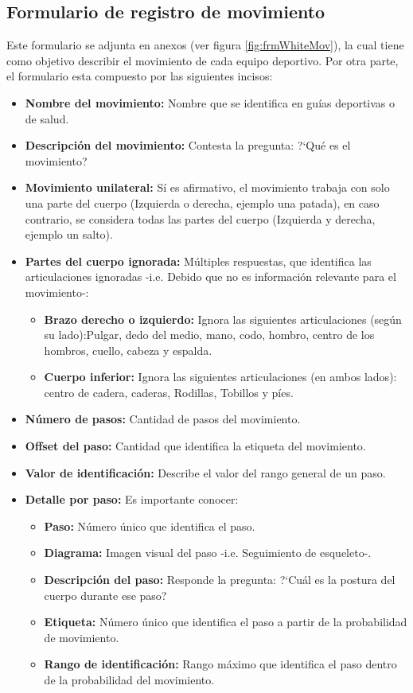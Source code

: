 \subsection{Formulario de registro de movimiento} \label{ins:frmMov}
Este formulario se adjunta en anexos (ver figura \ref{fig:frmWhiteMov}), la cual tiene como objetivo describir el movimiento de cada equipo deportivo. Por otra parte, el formulario esta compuesto por las siguientes incisos:
\begin{itemize}
	\item \textbf{Nombre del movimiento:} Nombre que se identifica en gu\'ias deportivas o de salud.
	\item \textbf{Descripci\'on del movimiento: } Contesta la pregunta: ?`Qu\'e es el movimiento?
	\item \textbf{Movimiento unilateral:} S\'i es afirmativo, el movimiento trabaja con solo una parte del cuerpo (Izquierda o derecha, ejemplo una patada), en caso contrario, se considera todas las partes del cuerpo (Izquierda y derecha, ejemplo un salto).
	\item \textbf{Partes del cuerpo ignorada:} M\'ultiples respuestas, que identifica las articulaciones ignoradas -i.e. Debido que no es informaci\'on relevante para el movimiento-:
	\begin{itemize}
		\item \textbf{Brazo derecho o izquierdo:} Ignora las siguientes articulaciones (seg\'un su lado):Pulgar, dedo del medio, mano, codo, hombro, centro de los hombros, cuello, cabeza y espalda.
		\item \textbf{Cuerpo inferior:} Ignora las siguientes articulaciones (en ambos lados): centro de cadera, caderas, Rodillas, Tobillos y p\'ies.
	\end{itemize}
		\item \textbf{N\'umero de pasos:} Cantidad de pasos del movimiento.
		\item \textbf{Offset del paso:} Cantidad que identifica la etiqueta del movimiento.
		\item \textbf{Valor de identificaci\'on:} Describe el valor del rango general de un paso.
		\item \textbf{Detalle por paso:} Es  importante conocer:
			\begin{itemize}
		\item \textbf{Paso:} N\'umero \'unico que identifica el paso.
		\item \textbf{Diagrama:} Imagen visual del paso -i.e. Seguimiento de esqueleto-.
		\item \textbf{Descripci\'on del paso:} Responde la pregunta: ?`Cu\'al es la postura del cuerpo durante ese paso?
		\item \textbf{Etiqueta:} N\'umero \'unico que identifica el paso a partir de la probabilidad de movimiento.
	\item \textbf{Rango de identificaci\'on:} Rango m\'aximo que identifica el paso dentro de la probabilidad del movimiento.
	\end{itemize}
\end{itemize}
